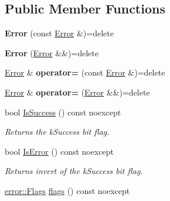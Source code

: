 \subsection*{Public Member Functions}
\begin{DoxyCompactItemize}
\item 
\hypertarget{classae_1_1_error_af8423867a7fddb42a71111b96c92c740}{}\label{classae_1_1_error_af8423867a7fddb42a71111b96c92c740} 
{\bfseries Error} (const \hyperlink{classae_1_1_error}{Error} \&)=delete
\item 
\hypertarget{classae_1_1_error_a60f2301a074178a8b3f8cf6bd37ec395}{}\label{classae_1_1_error_a60f2301a074178a8b3f8cf6bd37ec395} 
{\bfseries Error} (\hyperlink{classae_1_1_error}{Error} \&\&)=delete
\item 
\hypertarget{classae_1_1_error_a26a17a28eaed3d38349191ec5a878572}{}\label{classae_1_1_error_a26a17a28eaed3d38349191ec5a878572} 
\hyperlink{classae_1_1_error}{Error} \& {\bfseries operator=} (const \hyperlink{classae_1_1_error}{Error} \&)=delete
\item 
\hypertarget{classae_1_1_error_a5e800d8b4d0e8bccc14dd5dc815b9a08}{}\label{classae_1_1_error_a5e800d8b4d0e8bccc14dd5dc815b9a08} 
\hyperlink{classae_1_1_error}{Error} \& {\bfseries operator=} (\hyperlink{classae_1_1_error}{Error} \&\&)=delete
\item 
\hypertarget{classae_1_1_error_a5424dd175ff84fcc0dbc2bda1952b939}{}\label{classae_1_1_error_a5424dd175ff84fcc0dbc2bda1952b939} 
bool \hyperlink{classae_1_1_error_a5424dd175ff84fcc0dbc2bda1952b939}{Is\+Success} () const noexcept
\begin{DoxyCompactList}\small\item\em Returns the k\+Success bit flag. \end{DoxyCompactList}\item 
\hypertarget{classae_1_1_error_a12852602e662db19d5d7f5cc06256c46}{}\label{classae_1_1_error_a12852602e662db19d5d7f5cc06256c46} 
bool \hyperlink{classae_1_1_error_a12852602e662db19d5d7f5cc06256c46}{Is\+Error} () const noexcept
\begin{DoxyCompactList}\small\item\em Returns invert of the k\+Success bit flag. \end{DoxyCompactList}\item 
\hypertarget{classae_1_1_error_a7dbdfd03e6f6d180d1f0ded4efa10cac}{}\label{classae_1_1_error_a7dbdfd03e6f6d180d1f0ded4efa10cac} 
\hyperlink{structae_1_1error_1_1_flags}{error\+::\+Flags} \hyperlink{classae_1_1_error_a7dbdfd03e6f6d180d1f0ded4efa10cac}{flags} () const noexcept

\end{DoxyCompactItemize}

